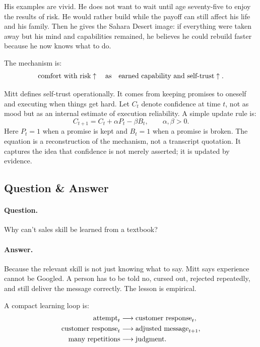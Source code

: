 His examples are vivid. He does not want to wait until age seventy-five to enjoy the results of risk. He would rather build while the payoff can still affect his life and his family. Then he gives the Sahara Desert image: if everything were taken away but his mind and capabilities remained, he believes he could rebuild faster because he now knows what to do.

The mechanism is:
\begin{equation}
  \hbox{comfort with risk}
  \uparrow
  \quad\hbox{as}\quad
  \hbox{earned capability and self-trust}
  \uparrow.
\end{equation}

Mitt defines self-trust operationally. It comes from keeping promises to oneself and executing when things get hard. Let \(C_t\) denote confidence at time \(t\), not as mood but as an internal estimate of execution reliability. A simple update rule is:
\begin{equation}
  C_{t+1}
  =
  C_t
  +
  \alpha P_t
  -
  \beta B_t,
  \qquad
  \alpha,\beta>0.
\end{equation}
Here \(P_t=1\) when a promise is kept and \(B_t=1\) when a promise is broken. The equation is a reconstruction of the mechanism, not a transcript quotation. It captures the idea that confidence is not merely asserted; it is updated by evidence.

\subsection{Question \& Answer}

\paragraph{Question.}
Why can't sales skill be learned from a textbook?

\paragraph{Answer.}
Because the relevant skill is not just knowing what to say. Mitt says experience cannot be Googled. A person has to be told no, cursed out, rejected repeatedly, and still deliver the message correctly. The lesson is empirical.

A compact learning loop is:
\begin{align}
  \hbox{attempt}_{t}
    &\longrightarrow
  \hbox{customer response}_{t},\\
  \hbox{customer response}_{t}
    &\longrightarrow
  \hbox{adjusted message}_{t+1},\\
  \hbox{many repetitions}
    &\longrightarrow
  \hbox{judgment}.
\end{align}

